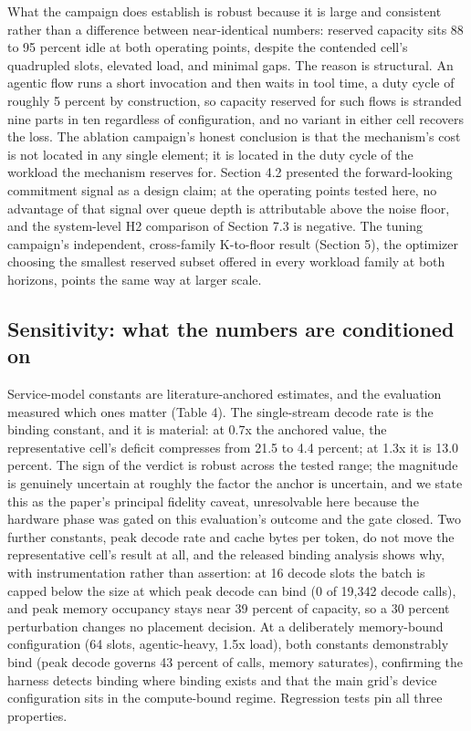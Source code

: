 What the campaign does establish is robust because it is large and
consistent rather than a difference between near-identical numbers:
reserved capacity sits 88 to 95 percent idle at both operating points,
despite the contended cell's quadrupled slots, elevated load, and minimal
gaps. The reason is structural. An agentic flow runs a short invocation and
then waits in tool time, a duty cycle of roughly 5 percent by
construction, so capacity reserved for such flows is stranded nine parts
in ten regardless of configuration, and no variant in either cell recovers
the loss. The ablation campaign's honest conclusion is that the
mechanism's cost is not located in any single element; it is located in
the duty cycle of the workload the mechanism reserves for. Section 4.2
presented the forward-looking commitment signal as a design claim; at the
operating points tested here, no advantage of that signal over queue depth
is attributable above the noise floor, and the system-level H2 comparison
of Section 7.3 is negative. The tuning campaign's independent,
cross-family K-to-floor result (Section 5), the optimizer choosing the
smallest reserved subset offered in every workload family at both
horizons, points the same way at larger scale.

\subsection{Sensitivity: what the numbers are conditioned on}

\begin{table}[tbp]
\centering
\footnotesize
\caption{Service-model sensitivity: measured effect and binding classification per constant.}
\label{tab:sens}

\end{table}

Service-model constants are literature-anchored estimates, and the
evaluation measured which ones matter (Table 4). The single-stream decode
rate is the binding constant, and it is material: at 0.7x the anchored
value, the representative cell's deficit compresses from 21.5 to 4.4
percent; at 1.3x it is 13.0 percent. The sign of the verdict is robust
across the tested range; the magnitude is genuinely uncertain at roughly
the factor the anchor is uncertain, and we state this as the paper's
principal fidelity caveat, unresolvable here because the hardware phase
was gated on this evaluation's outcome and the gate closed. Two further
constants, peak decode rate and cache bytes per token, do not move the
representative cell's result at all, and the released binding analysis
shows why, with instrumentation rather than assertion: at 16 decode slots
the batch is capped below the size at which peak decode can bind (0 of
19,342 decode calls), and peak memory occupancy stays near 39 percent of
capacity, so a 30 percent perturbation changes no placement decision. At
a deliberately memory-bound configuration (64 slots, agentic-heavy, 1.5x
load), both constants demonstrably bind (peak decode governs 43 percent
of calls, memory saturates), confirming the harness detects binding where
binding exists and that the main grid's device configuration sits in the
compute-bound regime. Regression tests pin all three properties.

